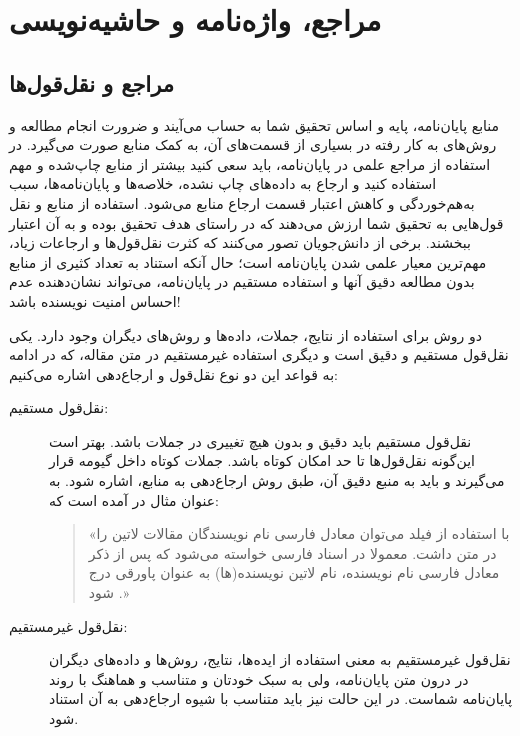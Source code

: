 \chapter{مراجع، واژه‌نامه و حاشیه‌نویسی}
\thispagestyle{fancy}\clearpage
\label{app:refMan}

\section{مراجع و نقل‌قول‌ها}
\label{sec:refUsage}
منابع پایان‌نامه، پایه و اساس تحقیق شما به حساب می‌آیند و ضرورت انجام مطالعه و روش‌های به کار رفته در بسیاری از قسمت‌های آن، به کمک منابع صورت می‌گیرد. در استفاده از مراجع علمی در پایان‌نامه، باید سعی کنید بیشتر از
منابع چاپ‌شده و مهم
استفاده کنید و
ارجاع به داده‌های چاپ نشده، خلاصه‌ها و پایان‌نامه‌ها، سبب به‌هم‌خوردگی و کاهش اعتبار قسمت ارجاع منابع می‌شود.
استفاده از منابع و نقل قول‌هایی به تحقیق شما ارزش می‌دهند که
در راستای هدف تحقیق بوده و به آن اعتبار ببخشند.
برخی از دانش‌جویان تصور می‌کنند که کثرت نقل‌قول‌ها و ارجاعات زیاد، مهم‌ترین معیار علمی شدن پایان‌نامه است؛ حال آنکه استناد به تعداد کثیری از منابع بدون مطالعه دقیق آنها و استفاده مستقیم در پایان‌نامه، می‌تواند نشان‌دهنده عدم احساس امنیت نویسنده باشد!

دو روش برای استفاده از نتایج، جملات، داده‌ها و روش‌های دیگران وجود دارد. یکی نقل‌قول مستقیم و دقیق است و دیگری استفاده غیرمستقیم در متن مقاله، که در ادامه به قواعد این دو نوع نقل‌قول و ارجاع‌دهی اشاره می‌کنیم:
\begin{description}
	\item[نقل‌قول مستقیم:]
	نقل‌قول مستقیم باید دقیق و بدون هیچ تغییری در جملات باشد. بهتر است این‌گونه نقل‌قول‌ها تا حد امکان کوتاه باشد. جملات کوتاه داخل گیومه قرار می‌گیرند و باید به منبع دقیق آن، طبق روش ارجاع‌دهی به منابع، اشاره شود. به عنوان مثال در
	\cite{persianbib87userguide}
	آمده است که:
	\begin{quote}
		«با استفاده از فیلد
		می‌توان معادل فارسی نام نویسندگان مقالات لاتین را در متن داشت. معمولا در اسناد فارسی خواسته می‌شود که پس از ذکر معادل فارسی نام نویسنده، نام لاتین نویسنده(ها) به عنوان پاورقی درج شود
		\citep{persianbib87userguide}.»
	\end{quote}
	\item[نقل‌قول غیرمستقیم:]
	نقل‌قول غیرمستقیم به معنی استفاده از ایده‌ها، نتایج، روش‌ها و داده‌های دیگران در درون متن پایان‌نامه، ولی به سبک خودتان و متناسب و هماهنگ با روند پایان‌نامه شماست. در این حالت نیز باید متناسب با شیوه ارجاع‌دهی به آن استناد شود.
\end{description}

